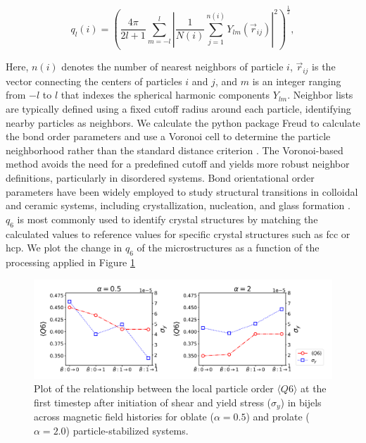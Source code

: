 \begin{equation}
q_l(i) = \left( \frac{4\pi}{2l+1} \sum_{m=-l}^{l} \left| \frac{1}{N(i)} \sum_{j=1}^{n(i)} Y_{lm}(\vec{r}_{ij}) \right|^2 \right)^{\frac{1}{2}} ,
\end{equation} 

Here, \(n(i)\) denotes the number of nearest neighbors of particle \(i\), \(\vec{r}_{ij}\) is the vector connecting the centers of particles \(i\) and \(j\), 
and \(m\) is an integer ranging from \(-l\) to \(l\) that indexes the spherical harmonic components \(Y_{lm}\). Neighbor lists are typically defined using a 
fixed cutoff radius around each particle, identifying nearby particles as neighbors. We calculate the python package Freud to calculate the bond order parameters 
and use a Voronoi cell to determine the particle neighborhood rather than the standard distance criterion \cite{ramasubramani_freud_2020,mickel_shortcomings_2013}. 
The Voronoi-based method avoids the need for a predefined cutoff and yields more robust neighbor definitions, particularly in disordered systems. Bond 
orientational order parameters have been widely employed to study structural transitions in colloidal and ceramic systems, including crystallization, nucleation, 
and glass formation \cite{vagberg_glassiness_2011, besseling_three-dimensional_2007, schall_structural_2007, ozawa_jamming_2012}. $q_6$ is most commonly used 
to identify crystal structures by matching the calculated values to reference values for specific crystal structures such as fcc or hcp. We plot the change in 
$q_6$ of the microstructures as a function of the processing applied in Figure \ref{fig:q6_rheology_init}

\begin{figure} 
    \centering 
    \includegraphics[scale=0.4]{../figures/results/paper3/Q6-start.png} 
    \caption{Plot of the relationship between the local particle order $\langle Q6 \rangle$ at the first timestep after initiation of shear and 
             yield stress ($\sigma_y$) in bijels across magnetic field histories for oblate 
             ($\alpha = 0.5$) and prolate ($\alpha = 2.0$) particle-stabilized systems.} 
    \label{fig:q6_rheology_init} 
\end{figure}

